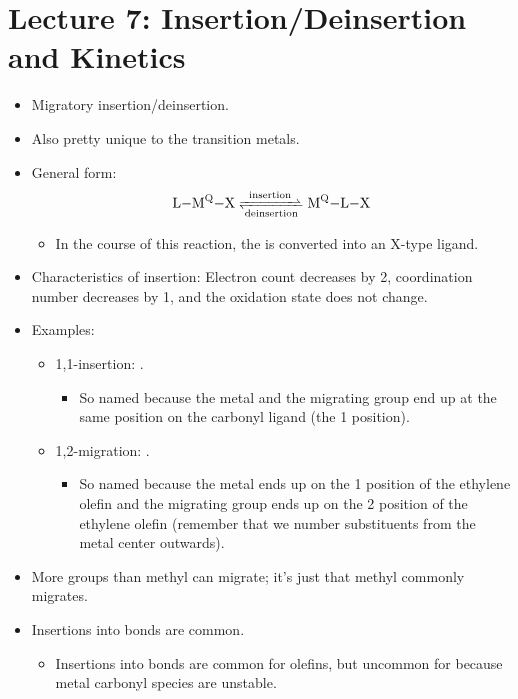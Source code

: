 \documentclass[../notes.tex]{subfiles}
\begin{document}
\section{Lecture 7: Insertion/Deinsertion and Kinetics}
\begin{itemize}
    \item {}Migratory insertion/deinsertion.
    \item Also pretty unique to the transition metals.
    \item General form:
    \begin{equation*}
        \ce{L-M^Q-X <=>[{insertion}][{deinsertion}] M^Q-L-X}
    \end{equation*}
    \begin{itemize}
        \item In the course of this reaction, the  is converted into an X-type ligand.
    \end{itemize}
    \item Characteristics of insertion: Electron count decreases by 2, coordination number decreases by 1, and the oxidation state does not change.
    \item Examples:
    \begin{itemize}
        \item 1,1-insertion: .
        \begin{itemize}
            \item So named because the metal and the migrating group end up at the same position on the carbonyl ligand (the 1 position).
        \end{itemize}
        \item 1,2-migration: .
        \begin{itemize}
            \item So named because the metal ends up on the 1 position of the ethylene olefin and the migrating group ends up on the 2 position of the ethylene olefin (remember that we number substituents from the metal center outwards).
        \end{itemize}
    \end{itemize}
    \item More groups than methyl can migrate; it's just that methyl commonly migrates.
    \item Insertions into  bonds are common.
    \begin{itemize}
        \item Insertions into  bonds are common for olefins, but uncommon for  because metal carbonyl species are unstable.

\end{itemize}
\end{itemize}
\end{document}
